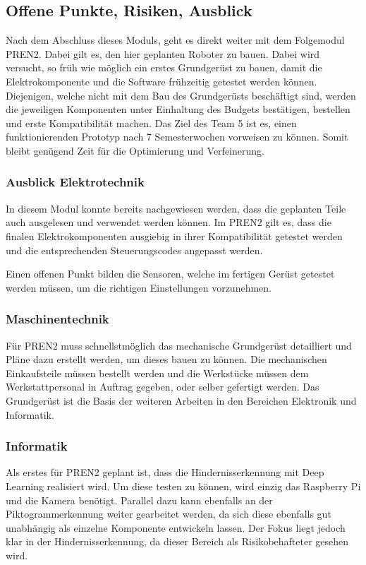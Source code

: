 \subsection{Offene Punkte, Risiken, Ausblick}

Nach dem Abschluss dieses Moduls, geht es direkt weiter mit dem Folgemodul PREN2. Dabei gilt es, den hier geplanten Roboter zu bauen. Dabei wird versucht, so früh wie möglich ein erstes Grundgerüst zu bauen, damit die Elektrokomponente und die Software frühzeitig getestet werden können. Diejenigen, welche nicht mit dem Bau des Grundgerüsts beschäftigt sind, werden die jeweiligen Komponenten unter Einhaltung des Budgets bestätigen, bestellen und erste Kompatibilität machen.
Das Ziel des Team 5 ist es, einen funktionierenden Prototyp nach 7 Semesterwochen vorweisen zu können. Somit bleibt genügend Zeit für die Optimierung und Verfeinerung.

\subsubsection{Ausblick Elektrotechnik}
In diesem Modul konnte bereits nachgewiesen werden, dass die geplanten Teile auch ausgelesen und verwendet werden können. Im PREN2 gilt es, dass die finalen Elektrokomponenten ausgiebig in ihrer Kompatibilität getestet werden und die entsprechenden Steuerungscodes angepasst werden.

Einen offenen Punkt bilden die Sensoren, welche im fertigen Gerüst getestet werden müssen, um die richtigen Einstellungen vorzunehmen.

\subsubsection{Maschinentechnik}
Für PREN2 muss schnellstmöglich das mechanische Grundgerüst detailliert und Pläne dazu erstellt werden, um dieses bauen zu können. Die mechanischen Einkaufsteile müssen bestellt werden und die Werkstücke müssen dem Werkstattpersonal in Auftrag gegeben, oder selber gefertigt werden. Das Grundgerüst ist die Basis der weiteren Arbeiten in den Bereichen Elektronik und Informatik. 


\subsubsection{Informatik}
Als erstes für PREN2 geplant ist, dass die Hindernisserkennung mit Deep Learning realisiert wird. Um diese testen zu können, wird einzig das Raspberry Pi und die Kamera benötigt. Parallel dazu kann ebenfalls an der Piktogrammerkennung weiter gearbeitet werden, da sich diese ebenfalls gut unabhängig als einzelne Komponente entwickeln lassen. Der Fokus liegt jedoch klar in der Hindernisserkennung, da dieser Bereich als Risikobehafteter gesehen wird.




